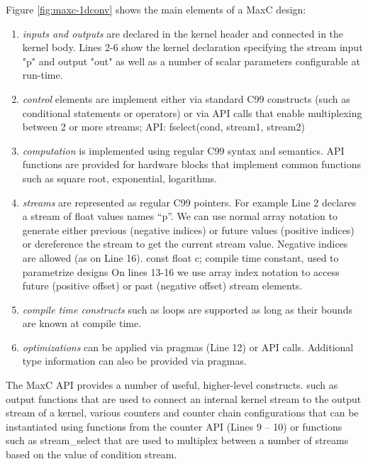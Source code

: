 Figure \ref{fig:maxc-1dconv} shows the main elements of a MaxC design:

\begin{enumerate}
\item \emph{inputs and outputs} are declared in the kernel header and
  connected in the kernel body. Lines 2-6 show the kernel declaration
  specifying the stream input "p" and output "out" as well as a number
  of scalar parameters configurable at run-time.

\item \emph{control} elements are implement either via standard C99
  constructs (such as conditional statements or operators) or via API
  calls that enable multiplexing between 2 or more streams; API:
  fselect(cond, stream1, stream2)

\item \emph{computation} is implemented using regular C99 syntax and
  semantics. API functions are provided for hardware blocks that
  implement common functions such as square root, exponential,
  logarithms.


\item \emph{streams} are represented as regular C99 pointers. For
  example Line 2 declares a stream of float values names ``p''. We can
  use normal array notation to generate either previous (negative
  indices) or future values (positive indices) or dereference the
  stream to get the current stream value. Negative indices are allowed
  (as on Line 16). const float c; compile time constant, used to
  parametrize designs On lines 13-16 we use array index notation to
  access future (positive offset) or past (negative offset) stream
  elements.

\item \emph{compile time constructs} such as loops are supported as
  long as their bounds are known at compile time.

\item \emph{optimizations} can be applied via pragmas (Line 12) or API
  calls. Additional type information can also be provided via pragmas.

\end{enumerate}

The MaxC API provides a number of useful, higher-level constructs.
such as output functions that are used to connect an internal kernel
stream to the output stream of a kernel, various counters and counter
chain configurations that can be instantiated using functions from the
counter API (Lines 9 -- 10) or functions such as stream\_select that
are used to multiplex between a number of streams based on the value
of condition stream.




